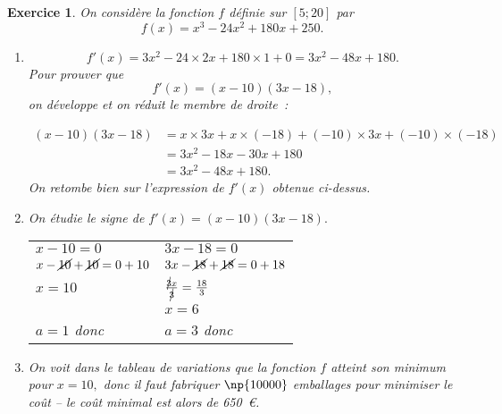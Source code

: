\documentclass[10pt]{article}
\newtheorem{exo}{Exercice}
\begin{document}
\begin{exo}


On considère la fonction $f$ définie sur $\left[5;20\right]$ par \[f(x)=x^3-24x^2+180x+250.\]

\begin{enumerate}
\item \[f'(x)= 3x^2-24\times 2x+180\times 1+0=3x^2-48x+180.\] Pour prouver que
\[f'(x)=(x-10)(3x-18),\] on développe et on réduit le membre de droite~:

\begin{align*}
(x-10)(3x-18)&=x\times 3x+x\times (-18)+(-10)\times 3x+(-10)\times (-18)\\
&=3x^2-18x-30x+180\\
&=3x^2-48x+180.\end{align*} On retombe bien sur l'expression de $f'(x)$ obtenue ci-dessus.
\item On étudie le signe de $f'(x)=(x-10)(3x-18).$

\medskip

{\setlength{\arrayrulewidth}{2pt}
\begin{center}
\begin{tabular}{l|l}
$x-10=0$&$3x-18=0$\\
$x-\cancel{10}+\cancel{10}=0+10$&$3x-\cancel{18}+\cancel{18}=0+18$\\
$x=10$&$\frac{\cancel{3}x}{\cancel{3}}=\frac{18}{3}$\\
&$x=6$ \\
$a=1$ donc \fbox{$-~\upphi~+$}&$a=3$ donc \fbox{$-~\upphi~+$}
\end{tabular}
\end{center}}

\medskip


\begin{center}
\end{center}


\item On voit dans le tableau de variations que la fonction $f$ atteint son minimum pour $x=10,$ donc il faut fabriquer $\np{10000}$ emballages pour minimiser le coût -- le coût minimal est alors de 650~\euro.
\end{enumerate}

\end{exo}
\end{document}
